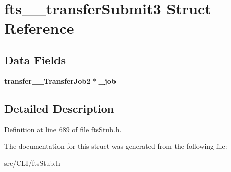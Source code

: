 \section{fts\_\-\_\-transferSubmit3 Struct Reference}
\label{structfts____transferSubmit3}
\subsection*{Data Fields}
\begin{DoxyCompactItemize}
\item 
{\bf transfer\_\-\_\-TransferJob2} $\ast$ {\bfseries \_\-job}\label{structfts____transferSubmit3_a8e8ca6daaeb4a7fb0fea6d960eee5414}

\end{DoxyCompactItemize}


\subsection{Detailed Description}


Definition at line 689 of file ftsStub.h.



The documentation for this struct was generated from the following file:\begin{DoxyCompactItemize}
\item 
src/CLI/ftsStub.h\end{DoxyCompactItemize}
